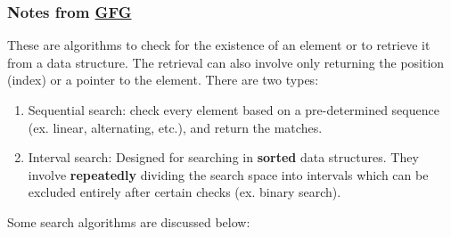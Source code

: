 \documentclass{article}
\begin{document}
\subsubsection*{Notes from \href{https://www.geeksforgeeks.org/searching-algorithms/}{GFG}}
These are algorithms to check for the existence of an element or to retrieve it from
a data structure. The retrieval can also involve only returning the position (index)
or a pointer to the element. There are two types:
\begin{enumerate}
    \item Sequential search: check every element based on a pre-determined sequence (ex. linear, alternating, etc.),
    and return the matches.
    \item Interval search: Designed for searching in \textbf{sorted} data structures.
    They involve \textbf{repeatedly} dividing the search space into intervals which
    can be excluded entirely after certain checks (ex. binary search).
\end{enumerate}
Some search algorithms are discussed below:
\end{document}
